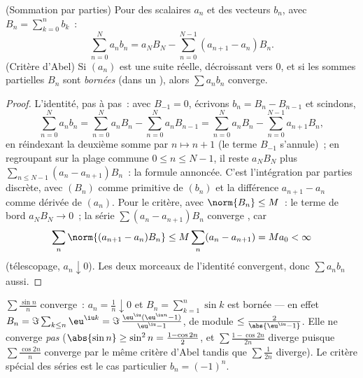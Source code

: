 \begin{theorem}\label{thm:b2:series:abel}
(Sommation par parties) Pour des scalaires $a_n$ et des vecteurs
$b_n$, avec $B_n = \sum_{k=0}^{n} b_k$~:
\[
\sum_{n=0}^{N} a_n b_n
= a_N B_N - \sum_{n=0}^{N-1} (a_{n+1} - a_n) B_n .
\]
(Critère d'Abel) Si $(a_n)$ est une suite réelle, décroissant vers
$0$, et si les sommes partielles $B_n$ sont \emph{bornées} (dans un
), alors $\sum a_n b_n$ converge.
\end{theorem}

\begin{proof}
L'identité, pas à pas~: avec $B_{-1} = 0$, écrivons $b_n = B_n -
B_{n-1}$ et scindons,
\[
\sum_{n=0}^{N} a_nb_n
= \sum_{n=0}^{N} a_nB_n - \sum_{n=0}^{N} a_nB_{n-1}
= \sum_{n=0}^{N} a_nB_n - \sum_{n=0}^{N-1} a_{n+1}B_{n} ,
\]
en réindexant la deuxième somme par $n \mapsto n + 1$ (le terme
$B_{-1}$ s'annule)~; en regroupant sur la plage commune $0 \leq n
\leq N-1$, il reste $a_NB_N$ plus $\sum_{n\leq N-1}(a_n -
a_{n+1})B_n$~: la formule annoncée. C'est l'intégration par parties
discrète, avec $(B_n)$ comme primitive de $(b_n)$ et la différence
$a_{n+1} - a_n$ comme dérivée de $(a_n)$. Pour le critère, avec
$\norm{B_n} \leq M$~: le terme de bord $a_N B_N \to 0$~; la série
$\sum (a_n - a_{n+1})B_n$ converge , car
\[
\sum_n \norm{(a_{n+1} - a_n)B_n} \leq M \sum_n (a_n - a_{n+1})
= M a_0 < \infty
\]
(télescopage, $a_n \downarrow 0$). Les deux morceaux de l'identité
convergent, donc $\sum a_n b_n$ aussi.
\end{proof}

\begin{example}\label{ex:b2:series:sinn}
$\sum \frac{\sin n}{n}$ converge~: $a_n = \frac1n \downarrow 0$ et
$B_n = \sum_{k=1}^{n} \sin k$ est bornée --- en effet $B_n =
\Im\sum_{k \leq n} \eu^{\iu k} = \Im\,\frac{\eu^{\iu}(\eu^{\iu n} -
1)}{\eu^{\iu} - 1}$, de module $\leq \frac{2}{\abs{\eu^{\iu} - 1}}$.
Elle ne converge \emph{pas}  ($\abs{\sin n} \geq \sin^2 n
= \frac{1 - \cos 2n}{2}$, et $\sum \frac{1 - \cos 2n}{2n}$ diverge
puisque $\sum \frac{\cos 2n}{n}$ converge par le même critère d'Abel
tandis que $\sum \frac{1}{2n}$ diverge). Le critère spécial des
séries  est le cas particulier $b_n = (-1)^n$.
\end{example}

